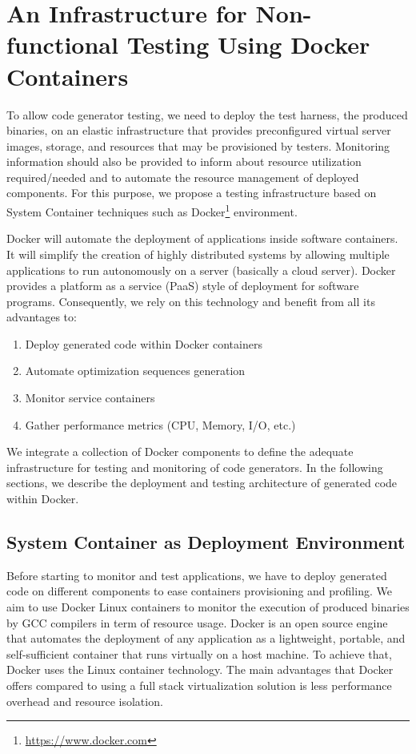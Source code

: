 \section{An Infrastructure for Non-functional Testing Using Docker Containers}

To allow code generator testing, we need to deploy the test harness, \ie the produced binaries, on an elastic infrastructure that provides preconfigured virtual server images, storage, and resources that may be provisioned by testers. 
Monitoring information should also be provided to inform about resource utilization required/needed and to automate the resource management of deployed components. 
For this purpose, we propose a testing infrastructure based on System Container techniques such as Docker\footnote{\url{https://www.docker.com}} environment. 

Docker will automate the deployment of applications inside software containers. It will simplify the creation of highly distributed systems by allowing multiple applications to run autonomously on a server (basically a cloud server). 
Docker provides a platform as a service (PaaS) style of deployment for software programs. 
Consequently, we rely on this technology and benefit from all its advantages to:
\begin{enumerate}
	\item Deploy generated code within Docker containers
	\item Automate optimization sequences generation
	\item Monitor service containers
	\item Gather performance metrics (CPU, Memory, I/O, etc.)
\end{enumerate}

We integrate a collection of Docker components to define the adequate infrastructure for testing and monitoring of code generators. 
In the following sections, we describe the deployment and testing architecture of generated code within Docker.

\subsection{System Container as Deployment Environment}

Before starting to monitor and test applications, we have to deploy generated code on different components to ease containers provisioning and profiling.
We aim to use Docker Linux containers to monitor the execution of produced binaries by GCC compilers in term of resource usage. 
Docker is an open source engine that automates the deployment of any application as a lightweight, portable, and self-sufficient container that runs virtually on a host machine. 
To achieve that, Docker uses the Linux container technology. The main advantages that Docker offers compared to using a full stack virtualization solution is less performance overhead and resource isolation. 


